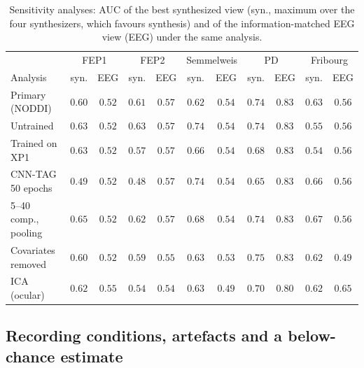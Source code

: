 \documentclass[pdflatex,referee,sn-basic]{sn-jnl}%
\begin{document}
\begin{table}[!htbp]
    \centering
    \caption{Sensitivity analyses: AUC of the best synthesized view (syn., maximum over the four synthesizers, which favours synthesis) and of the information-matched EEG view (EEG) under the same analysis.}
    \label{tab:sens}
    \scriptsize\setlength{\tabcolsep}{2.5pt}
    \begin{tabular}{@{}l cc cc cc cc cc@{}}
        \hline
        & \multicolumn{2}{c}{FEP1} & \multicolumn{2}{c}{FEP2} & \multicolumn{2}{c}{Semmelweis} & \multicolumn{2}{c}{PD} & \multicolumn{2}{c}{Fribourg} \\
        Analysis & syn. & EEG & syn. & EEG & syn. & EEG & syn. & EEG & syn. & EEG \\
        \hline
        Primary (NODDI) & $0.60$ & $0.52$ & $0.61$ & $0.57$ & $0.62$ & $0.54$ & $0.74$ & $0.83$ & $0.63$ & $0.56$ \\
        Untrained & $0.63$ & $0.52$ & $0.63$ & $0.57$ & $0.74$ & $0.54$ & $0.74$ & $0.83$ & $0.55$ & $0.56$ \\
        Trained on XP1 & $0.63$ & $0.52$ & $0.57$ & $0.57$ & $0.66$ & $0.54$ & $0.68$ & $0.83$ & $0.54$ & $0.56$ \\
        CNN-TAG 50 epochs & $0.49$ & $0.52$ & $0.48$ & $0.57$ & $0.74$ & $0.54$ & $0.65$ & $0.83$ & $0.66$ & $0.56$ \\
        5--40 comp., pooling & $0.65$ & $0.52$ & $0.62$ & $0.57$ & $0.68$ & $0.54$ & $0.74$ & $0.83$ & $0.67$ & $0.56$ \\
        Covariates removed & $0.60$ & $0.52$ & $0.59$ & $0.55$ & $0.63$ & $0.53$ & $0.75$ & $0.83$ & $0.62$ & $0.49$ \\
        ICA (ocular) & $0.62$ & $0.55$ & $0.54$ & $0.54$ & $0.63$ & $0.49$ & $0.70$ & $0.80$ & $0.62$ & $0.65$ \\
        \hline
    \end{tabular}
\end{table}

\subsection{Recording conditions, artefacts and a below-chance estimate}\label{section:res_checks}
\end{document}
